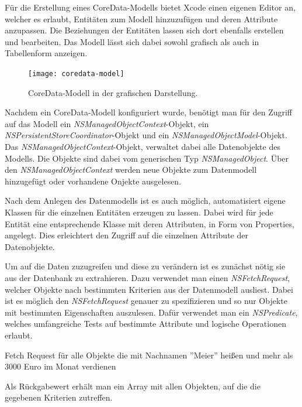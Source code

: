 Für die Erstellung eines CoreData-Modells bietet Xcode einen eigenen Editor an, welcher es erlaubt, Entitäten zum Modell hinzuzufügen und deren Attribute anzupassen. Die Beziehungen der Entitäten lassen sich dort ebenfalls erstellen und bearbeiten. Das Modell lässt sich dabei sowohl grafisch als auch in Tabellenform anzeigen.

\begin{figure}[htb!]
		\centering
	\texttt{[image: coredata-model]}
	\caption{CoreData-Modell in der grafischen Darstellung.}
	\label{coredata-model}
\end{figure}


Nachdem ein CoreData-Modell konfiguriert wurde, benötigt man für den Zugriff auf das Modell ein \emph{NSManagedObjectContext}-Objekt, ein \emph{NSPersistentStoreCoordinator}-Objekt und ein \emph{NSManagedObjectModel}-Objekt. Das \emph{NSManagedObjectContext}-Objekt, verwaltet dabei alle Datenobjekte des Modells. Die Objekte sind dabei vom generischen Typ \emph{NSManagedObject}. Über den \emph{NSManagedObjectContext} werden neue Objekte zum Datenmodell hinzugefügt oder vorhandene Onjekte ausgelesen.

Nach dem Anlegen des Datenmodells ist es auch möglich, automatisiert eigene Klassen für die einzelnen Entitäten erzeugen zu lassen. Dabei wird für jede Entität eine entsprechende Klasse mit deren Attributen, in Form von Properties, angelegt. Dies erleichtert den Zugriff auf die einzelnen Attribute der Datenobjekte.

Um auf die Daten zuzugreifen und diese zu verändern ist es zunächst nötig sie aus der Datenbank zu extrahieren. Dazu verwendet man einen \emph{NSFetchRequest}, welcher Objekte nach bestimmten Kriterien aus der Datenmodell ausliest.
Dabei ist es möglich den \emph{NSFetchRequest} genauer zu spezifizieren und so nur Objekte mit bestimmten Eigenschaften auszulesen.
Dafür verwendet man ein \emph{NSPredicate}, welches umfangreiche Tests auf bestimmte Attribute und logische Operationen erlaubt.

\begin{listing}[htb! breaklines=true]
    \caption{Fetch Request für alle Objekte die mit Nachnamen ''Meier'' heißen und mehr als 3000 Euro im Monat verdienen}
	\label{lst:NSFetchRequest_objc}
\end{listing}

Als Rückgabewert erhält man ein Array mit allen Objekten, auf die die gegebenen Kriterien zutreffen.

